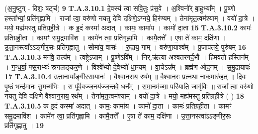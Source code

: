 \documentclass[17pt]{extarticle}
\begin{document}
                  \newline
                                                        (अ॒नु॒ष्टुग् - दिशः॒ षट्च॑) \textbf{9} \newline \newline
                                \textbf{ T.A.3.10.1} \newline
                  दे॒वस्य॑ त्वा सवि॒तुः प्र॑स॒वे । अ॒श्विनो᳚र् बा॒हुभ्या᳚म् ।  पू॒ष्णो हस्ता᳚भ्यां॒ प्रति॑गृह्णामि ।  राजा᳚ त्वा॒ वरु॑णो नयतु देवि दक्षिणे॒ऽग्नये॒ हिर॑ण्यम् । तेना॑मृत॒त्वम॑श्याम् । वयो॑ दा॒त्रे । मयो॒ मह्य॑मस्तु प्रतिग्रही॒त्रे । क इ॒दं कस्मा॑ अदात् । कामः॒ कामा॑य । कामो॑ दा॒ता \textbf{ 15} \newline
                  \newline
                                                                  \textbf{ T.A.3.10.2} \newline
                  कामः॑ प्रतिग्रही॒ता । कामꣳ॑ समु॒द्रमावि॑श । कामे॑न त्वा॒ प्रति॑गृह्णामि ।  कामै॒तत्ते᳚ । ए॒षा ते॑ काम॒ दक्षि॑णा । उ॒त्ता॒नस्त्वा᳚ऽऽङ्गीर॒सः प्रति॑गृह्णातु ।  सोमा॑य॒ वासः॑ । रु॒द्राय॒ गाम् । वरु॑णा॒याश्व᳚म् ।  प्र॒जाप॑तये॒ पुरु॑षम् \textbf{ 16} \newline
                  \newline
                                                                  \textbf{ T.A.3.10.3} \newline
                  मन॑वे॒ तल्प᳚म् । त्वष्ट्रे॒ऽजाम् । पू॒ष्णेऽवि᳚म् । निर्.ऋ॑त्या अश्वतरगर्द॒भौ । हि॒मव॑तो ह॒स्तिन᳚म् । ग॒न्ध॒र्वा॒-फ्स॒राभ्यः॑-स्रगलङ्कर॒णे ।  विश्वे᳚भ्यो दे॒वेभ्यो॑ धा॒न्यम् । वा॒चेऽन्न᳚म् । ब्रह्म॑ण ओद॒नम् । स॒मु॒द्रायापः॑ \textbf{ 17} \newline
                  \newline
                                                                  \textbf{ T.A.3.10.4} \newline
                  उ॒त्ता॒नाया᳚ङ्गीर॒सायानः॑ । वै॒श्वा॒न॒राय॒ रथ᳚म् ॥  वै॒श्वा॒न॒रः प्र॒त्नथा॒ नाक॒मारु॑हत् ।  दि॒वः पृ॒ष्ठं भन्द॑मानः सु॒मन्म॑भिः ।  स पू᳚र्व॒वज्ज॒नय॑ज्ज॒न्तवे॒ धन᳚म् । स॒मा॒नम॑ज्मा॒ परि॑याति॒ जागृ॑विः ॥  राजा᳚ त्वा॒ वरु॑णो नयतु देवि दक्षिणे वैश्वान॒राय॒ रथ᳚म् । तेना॑मृत॒त्वम॑श्याम् । वयो॑ दा॒त्रे ।  मयो॒ मह्य॑मस्तु प्रतिग्रही॒त्रे ( ) \textbf{ 18} \newline
                  \newline
                                                                  \textbf{ T.A.3.10.5} \newline
                  क इ॒दं कस्मा॑ अदात् । कामः॒ कामा॑य । कामो॑ दा॒ता ।  कामः॑ प्रतिग्रही॒ता । कामꣳ॑ समु॒द्रमावि॑श । कामे॑न त्वा॒ प्रति॑गृह्णामि । कामै॒तत्ते᳚ । ए॒षा ते॑ काम॒ दक्षि॑णा । उ॒त्ता॒नस्त्वा᳚ऽऽङ्गीर॒सः प्रति॑गृह्णातु । \textbf{ 19} \newline
\end{document}
